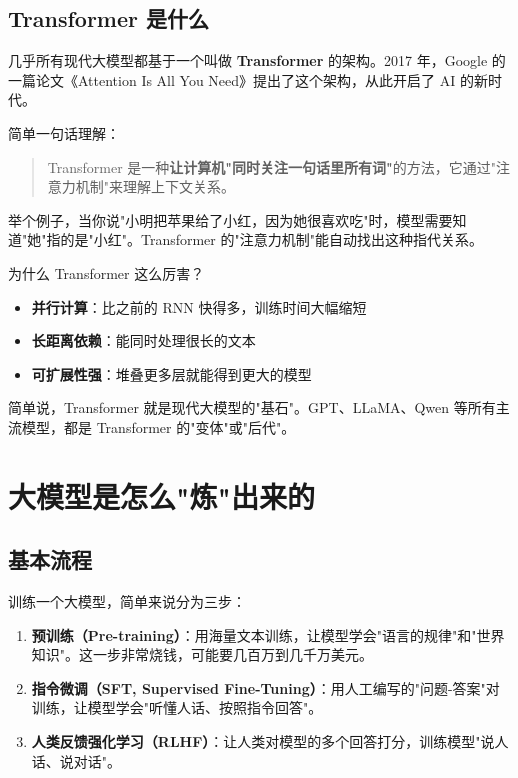\documentclass[12pt,UTF8]{ctexbook}
\begin{document}
\section{Transformer 是什么}

几乎所有现代大模型都基于一个叫做 \textbf{Transformer} 的架构。2017 年，Google 的一篇论文《Attention Is All You Need》提出了这个架构，从此开启了 AI 的新时代。

简单一句话理解：

\begin{quote}
Transformer 是一种\textbf{让计算机"同时关注一句话里所有词"}的方法，它通过"注意力机制"来理解上下文关系。
\end{quote}

举个例子，当你说"小明把苹果给了小红，因为她很喜欢吃"时，模型需要知道"她"指的是"小红"。Transformer 的"注意力机制"能自动找出这种指代关系。

为什么 Transformer 这么厉害？
\begin{itemize}
  \item \textbf{并行计算}：比之前的 RNN 快得多，训练时间大幅缩短
  \item \textbf{长距离依赖}：能同时处理很长的文本
  \item \textbf{可扩展性强}：堆叠更多层就能得到更大的模型
\end{itemize}

简单说，Transformer 就是现代大模型的"基石"。GPT、LLaMA、Qwen 等所有主流模型，都是 Transformer 的"变体"或"后代"。

\chapter{大模型是怎么"炼"出来的}

\section{基本流程}

训练一个大模型，简单来说分为三步：

\begin{enumerate}
  \item \textbf{预训练（Pre-training）}：用海量文本训练，让模型学会"语言的规律"和"世界知识"。这一步非常烧钱，可能要几百万到几千万美元。
  \item \textbf{指令微调（SFT, Supervised Fine-Tuning）}：用人工编写的"问题-答案"对训练，让模型学会"听懂人话、按照指令回答"。
  \item \textbf{人类反馈强化学习（RLHF）}：让人类对模型的多个回答打分，训练模型"说人话、说对话"。
\end{enumerate}
\end{document}
